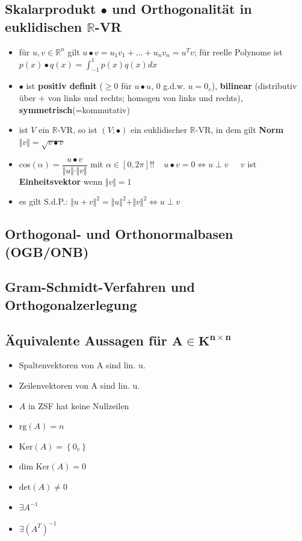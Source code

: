 \documentclass[10pt,a4paper]{article}
\begin{document}
\subsection{Skalarprodukt $\bullet$ und Orthogonalität in euklidischen $\mathbb{R}$-VR}
\begin{itemize}
\item für $u,v \in \mathbb{R}^{n}$ gilt $u\bullet v=u_{1}v_{1}+\dotsc +u_{n}v_{n}=u^{T}v$; für reelle Polynome ist $p(x)\bullet q(x)=\int_{-1}^{1} p(x)q(x) dx$
\item $\bullet$ ist \textbf{positiv definit} ($\geq 0$ für $u\bullet u$, 0 g.d.w. $u=0_{v}$), \textbf{bilinear} (distributiv über + von links und rechts; homogen von links und rechts), \textbf{symmetrisch}(=kommutativ)


\item ist $V$ ein $\mathbb{R}$-VR, so ist $(V;\bullet)$ ein euklidischer $\mathbb{R}$-VR, in dem gilt \textbf{Norm} $\Vert v \Vert=\sqrt{v\bullet v}$ 
\item cos$(\alpha)=\dfrac{u\bullet v}{\Vert u \Vert \cdot \Vert v\Vert}$ mit $\alpha\in [0,2\pi]$!!$\;\;\;\; u \bullet v=0 \Leftrightarrow u\perp v$ $\;\;\;\;v$ ist \textbf{Einheitsvektor} wenn $\Vert v \Vert=1$
\item es gilt S.d.P.: $\Vert u+v\Vert^2=\Vert u\Vert^2 +\Vert v \Vert^2 \Leftrightarrow u\perp v$


\end{itemize}



\subsection{Orthogonal- und Orthonormalbasen (OGB/ONB) }



\subsection{Gram-Schmidt-Verfahren und Orthogonalzerlegung}



\subsection{Äquivalente Aussagen für $\boldsymbol{A\in K^{n\times n}}$}
\begin{itemize}
\item Spaltenvektoren von A sind lin. u. 
\item Zeilenvektoren von A sind lin. u.
\item $A$ in ZSF hat keine Nullzeilen 
\item $\text{rg}(A)= n $
\item $\text{Ker}(A)=\left\lbrace 0_{v}\right\rbrace$
\item $\text{dim Ker}(A)=0$
\item $\text{det}(A)\neq 0$
\item $\exists A^{-1}$ 
\item $\exists (A^{T})^{-1}$
\end{itemize}
\end{document}
